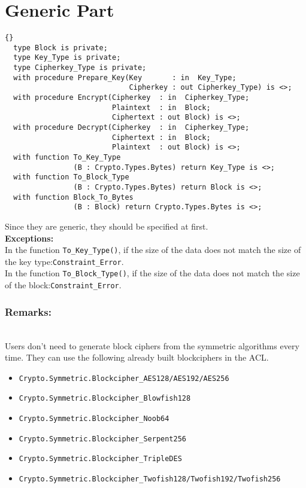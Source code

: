 \section{Generic Part}
\begin{lstlisting}{}
  type Block is private;
  type Key_Type is private;
  type Cipherkey_Type is private;
  with procedure Prepare_Key(Key       : in  Key_Type;
                             Cipherkey : out Cipherkey_Type) is <>;
  with procedure Encrypt(Cipherkey  : in  Cipherkey_Type;
                         Plaintext  : in  Block;
                         Ciphertext : out Block) is <>;
  with procedure Decrypt(Cipherkey  : in  Cipherkey_Type;
                         Ciphertext : in  Block;
                         Plaintext  : out Block) is <>;   
  with function To_Key_Type   
                (B : Crypto.Types.Bytes) return Key_Type is <>;
  with function To_Block_Type 
                (B : Crypto.Types.Bytes) return Block is <>;
  with function Block_To_Bytes
                (B : Block) return Crypto.Types.Bytes is <>;
\end{lstlisting}
Since they are generic, they should be specified at first.\\
\textbf{Exceptions:}\\
In the function \texttt{To\_Key\_Type()}, if the size of the data does not match the size of the key type:\quad\texttt{Constraint\_Error}.\\ 
In the function \texttt{To\_Block\_Type()}, if the size of the data does not match the size of the block:\quad\texttt{Constraint\_Error}.\\ 
\subsubsection*{Remarks:}\\
Users don't need to generate block ciphers from the symmetric algorithms every time. They can use the following already built blockciphers in the ACL.
\begin{itemize}
\item \texttt{Crypto.Symmetric.Blockcipher\_AES128/AES192/AES256}
\item \texttt{Crypto.Symmetric.Blockcipher\_Blowfish128}
\item \texttt{Crypto.Symmetric.Blockcipher\_Noob64}
\item \texttt{Crypto.Symmetric.Blockcipher\_Serpent256}
\item \texttt{Crypto.Symmetric.Blockcipher\_TripleDES}
\item \texttt{Crypto.Symmetric.Blockcipher\_Twofish128/Twofish192/Twofish256}
\end{itemize}
